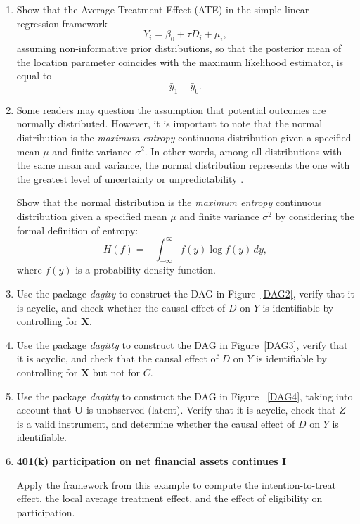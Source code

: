\begin{enumerate}
	\item Show that the Average Treatment Effect (ATE) in the simple linear regression framework
	\[
	Y_i = \beta_0 + \tau D_i + \mu_i,
	\]
	assuming non-informative prior distributions, so that the posterior mean of the location parameter coincides with the maximum likelihood estimator, is equal to
	\[
	\bar{y}_1 - \bar{y}_0.
	\]
	
	\item Some readers may question the assumption that potential outcomes are normally distributed. However, it is important to note that the normal distribution is the \textit{maximum entropy} continuous distribution given a specified mean $\mu$ and finite variance $\sigma^2$. In other words, among all distributions with the same mean and variance, the normal distribution represents the one with the greatest level of uncertainty or unpredictability \cite{cover2006elements}.
	
	Show that the normal distribution is the \textit{maximum entropy} continuous distribution given a specified mean $\mu$ and finite variance $\sigma^2$ by considering the formal definition of entropy:
	\[
	H(f) = - \int_{-\infty}^{\infty} f(y) \log f(y) \, dy,
	\]
	where $f(y)$ is a probability density function.
	
	\item Use the package \textit{dagity} to construct the DAG in Figure~\ref{DAG2}, verify that it is acyclic, and check whether the causal effect of \(D\) on \(Y\) is identifiable by controlling for \(\mathbf{X}\).
	
	\item Use the package \textit{dagitty} to construct the DAG in Figure~\ref{DAG3}, verify that it is acyclic, and check that the causal effect of \(D\) on \(Y\) is identifiable by controlling for \(\mathbf{X}\) but not for \(C\).
	
	\item Use the package \textit{dagitty} to construct the DAG in Figure~	\ref{DAG4}, taking into account that $\mathbf{U}$ is unobserved (latent). Verify that it is acyclic, check that $Z$ is a valid instrument, and determine whether the causal effect of \(D\) on \(Y\) is identifiable.
	
	\item \textbf{401(k) participation on net financial assets continues I}  
	
	Apply the framework from this example to compute the intention-to-treat effect, the local average treatment effect, and the effect of eligibility on participation.
	

\end{enumerate}
